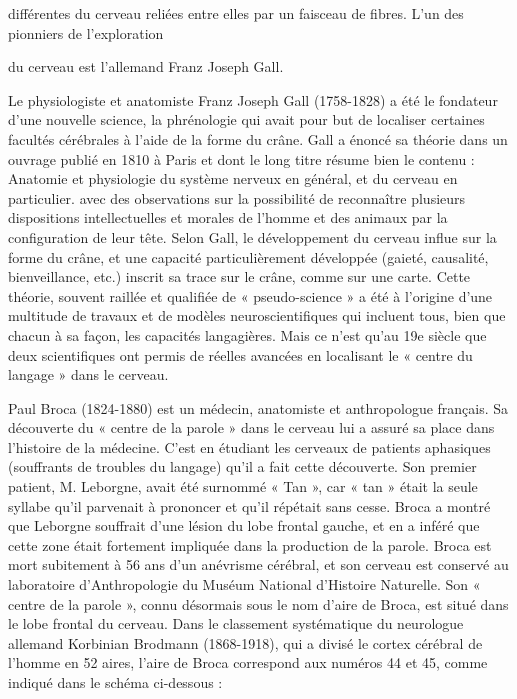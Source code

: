 différentes du cerveau reliées entre elles par un faisceau de fibres. L'un des pionniers de l'exploration

du cerveau est l'allemand Franz Joseph Gall.

Le physiologiste et anatomiste Franz Joseph Gall (1758-1828) a été le fondateur d’une nouvelle
science, la phrénologie qui avait pour but de localiser certaines facultés cérébrales à l’aide de
la forme du crâne. Gall a énoncé sa théorie dans un ouvrage publié en 1810 à Paris et dont le
long titre résume bien le contenu : Anatomie et physiologie du système nerveux en général,
et du cerveau en particulier. avec des observations sur la possibilité de reconnaître plusieurs
dispositions intellectuelles et morales de l'homme et des animaux par la configuration de leur tête.
Selon Gall, le développement du cerveau influe sur la forme du crâne, et une capacité
particulièrement développée (gaieté, causalité, bienveillance, etc.) inscrit sa trace sur le crâne,
comme sur une carte. Cette théorie, souvent raillée et qualifiée de « pseudo-science » a été à l’origine
d’une multitude de travaux et de modèles neuroscientifiques qui incluent tous, bien que chacun à
sa façon, les capacités langagières. Mais ce n'est qu’au 19e siècle que deux scientifiques ont permis
de réelles avancées en localisant le « centre du langage » dans le cerveau.

Paul Broca (1824-1880) est un médecin, anatomiste et anthropologue français. Sa découverte du
« centre de la parole » dans le cerveau lui a assuré sa place dans l’histoire de la médecine. C’est en
étudiant les cerveaux de patients aphasiques (souffrants de troubles du langage) qu’il a fait cette
découverte. Son premier patient, M. Leborgne, avait été surnommé « Tan », car « tan » était la
seule syllabe qu’il parvenait à prononcer et qu’il répétait sans cesse. Broca a montré que Leborgne
souffrait d’une lésion du lobe frontal gauche, et en a inféré que cette zone était fortement impliquée
dans la production de la parole.
Broca est mort subitement à 56 ans d’un anévrisme cérébral, et son cerveau est conservé au
laboratoire d'Anthropologie du Muséum National d'Histoire Naturelle. Son « centre de la parole »,
connu désormais sous le nom d’aire de Broca, est situé dans le lobe frontal du cerveau. Dans le
classement systématique du neurologue allemand Korbinian Brodmann (1868-1918), qui a
divisé le cortex cérébral de l’homme en 52 aires, l'aire de Broca correspond aux numéros 44 et 45,
comme indiqué dans le schéma ci-dessous :


